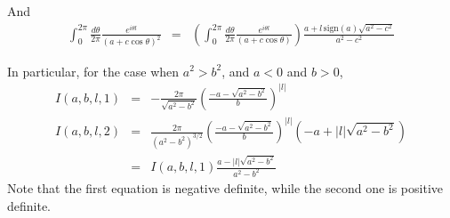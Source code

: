 \documentclass[aps,prc,preprint,tightenlines]{revtex4}
\newcommand{\sgn}{\mbox{sign}}
\begin{document}
And
\begin{eqnarray}
\int_0^{2\pi} \frac{d\theta}{2\pi}
\frac{e^{i \theta l}}{(a + c \cos\theta)^2}
&=& 
\left(\int_0^{2\pi} \frac{d\theta}{2\pi}
\frac{e^{i \theta l}}{(a + c \cos\theta)} \right)
\frac{a + l \, \sgn(a) \sqrt{a^2-c^2}}{a^2-c^2}
\end{eqnarray}

In particular, for the case when $a^2 > b^2$, and $a<0$ and $b>0$,
\begin{eqnarray}
I(a,b,l,1) &=& 
-\frac{2\pi}{\sqrt{a^2-b^2}} \left(\frac{-a - \sqrt{a^2-b^2}}{b}\right)^{|l|}
\label{cosintmeq1} \\
I(a,b,l,2) 
&=& 
 \frac{2\pi}{(a^2-b^2)^{3/2}} \left(\frac{-a - \sqrt{a^2-b^2}}{b}\right)^{|l|}
\left(-a + |l| \sqrt{a^2-b^2}\right) \label{cosintmeq2} \\
&=& I(a,b,l,1) \frac{a - |l| \sqrt{a^2-b^2}}{a^2-b^2} \nonumber 
\end{eqnarray}
Note that the first equation is negative definite, while the second one is 
positive definite.
\end{document}
